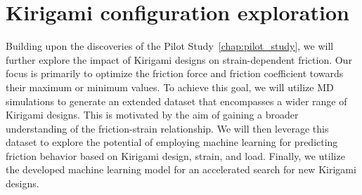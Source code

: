 \chapter{Kirigami configuration exploration}\label{chap:dataset_study}
Building upon the discoveries of the Pilot Study~\cref{chap:pilot_study}, we
will further explore the impact of Kirigami designs on strain-dependent
friction. Our focus is primarily to optimize the friction force and friction
coefficient towards their maximum or minimum values. To achieve this goal, we
will utilize \acrshort{MD} simulations to generate an extended dataset that
encompasses a wider range of Kirigami designs. This is motivated by the aim of
gaining a broader understanding of the friction-strain relationship. We will
then leverage this dataset to explore the potential of employing machine
learning for predicting friction behavior based on Kirigami design, strain, and
load. Finally, we utilize the developed machine learning model for an
accelerated search for new Kirigami designs. 


